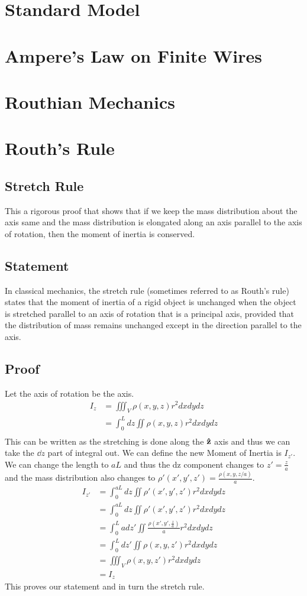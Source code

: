 \documentclass{article}
\begin{document}
\section{Standard Model}
\section{Ampere's Law on Finite Wires}
\section{Routhian Mechanics}
\newpage
\section{Routh's Rule}
\subsection{Stretch Rule}
This a rigorous proof that shows that if we keep the mass distribution about the axis same and the mass distribution is elongated along an axis parallel to the axis of rotation, then the moment of inertia is conserved.
\subsection{Statement}
\begin{example*}
    In classical mechanics, the stretch rule (sometimes referred to as Routh's rule) states that the moment of inertia of a rigid object is unchanged when the object is stretched parallel to an axis of rotation that is a principal axis, provided that the distribution of mass remains unchanged except in the direction parallel to the axis.
\end{example*}
\subsection{Proof}
Let the axis of rotation be the  axis.
\begin{align*}
    I_z &= \iiint_V \rho (x,y,z)r^2 dx dy dz\\
    &=\int^L_0dz\iint \rho(x,y,z)r^2 dx dy dz\\
\end{align*}
This can be written as the stretching is done along the $\vu{z}$ axis and thus we can take the $\dd{z}$ part of integral out. We can define the new Moment of Inertia is $I_{z'}$. We can change the length to $aL$ and thus the dz component changes to $z' = \frac{z}{a}$ and the mass distribution also changes to $\rho'(x',y',z') = \frac{\rho(x,y,z/a)}{a}$.
\begin{align*}
    I_{z'} &=\int^{aL}_0dz\iint \rho'(x',y',z')r^2 dx dy dz\\
    &= \int^{aL}_0dz\iint \rho'(x',y',z')r^2 dx dy dz\\
    &=\int^{L}_0adz'\iint \frac{\rho(x',y',\frac{z}{a})}{a}r^2 dx dy dz\\
    &=\int^{L}_0dz'\iint \rho(x,y,z')r^2 dx dy dz\\
    &=\iiint_V \rho (x,y,z')r^2 dx dy dz\\
    &=I_z
\end{align*}
This proves our statement and in turn the stretch rule.
\end{document}
